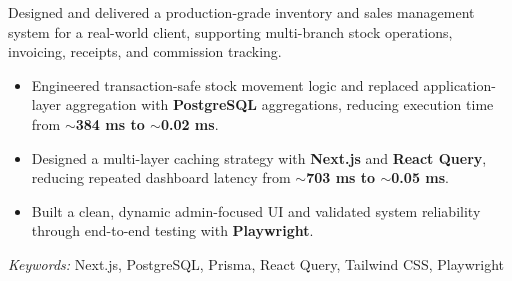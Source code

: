 \noindent
{}

\noindent
Designed and delivered a production-grade inventory and sales management system for a real-world client, supporting multi-branch stock operations, invoicing, receipts, and commission tracking.

\begin{itemize}
    \item Engineered transaction-safe stock movement logic and replaced application-layer aggregation with \textbf{PostgreSQL} aggregations, reducing execution time from \textbf{$\sim$384 ms to $\sim$0.02 ms}.
    \item Designed a multi-layer caching strategy with \textbf{Next.js} and \textbf{React Query}, reducing repeated dashboard latency from \textbf{$\sim$703 ms to $\sim$0.05 ms}.
    \item Built a clean, dynamic admin-focused UI and validated system reliability through end-to-end testing with \textbf{Playwright}.
\end{itemize}

\noindent
\textit{Keywords:} Next.js, PostgreSQL, Prisma, React Query, Tailwind CSS, Playwright

